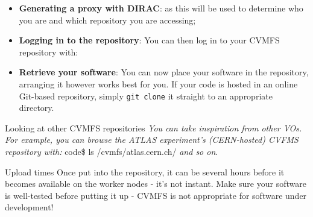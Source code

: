 \begin{itemize}
\tightlist
\item \textbf{Generating a proxy with DIRAC}: as this will be used to
determine who you are and which repository you are accessing;
\item \textbf{Logging in to the repository}: You can then log in to your CVMFS
repository with:

\begin{Shaded}
\begin{Highlighting}[]
\NormalTok{$ } 
 

    \KeywordTok{|} \KeywordTok{_} 
  \KeywordTok{(_|(_||_|||(_)|} \KeywordTok{|}
       \KeywordTok{|}

            \KeywordTok{)}
   
      

\NormalTok{[} \NormalTok{~]$ cd cvmfs_repo}
 
\end{Highlighting}
\end{Shaded}

\item
  \textbf{Retrieve your software}: You can now place your software in
  the repository, arranging it however works best for you. If your code
  is hosted in an online Git-based repository, simply
  \texttt{git\ clone} it straight to an appropriate directory.
\end{itemize}

\begin{infobox}{Looking at other CVMFS repositories}
\emph{You can take inspiration from other VOs. For example, you can browse the
ATLAS experiment's (CERN-hosted) CVFMS repository with:}
code{\$ ls /cvmfs/atlas.cern.ch/} \emph{and so on}.
\end{infobox}

\begin{warningbox}{Upload times}
Once put into the repository, it can be several hours before it becomes
available on the worker nodes - it's not instant. Make sure your
software is well-tested before putting it up - CVMFS is not appropriate
for software under development!
\end{warningbox}

